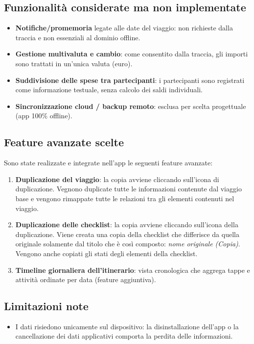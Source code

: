 \documentclass[11pt, a4paper]{article}
\begin{document}
\subsection{Funzionalità considerate ma non implementate}
\begin{itemize}[nosep]
    \item \textbf{Notifiche/promemoria} legate alle date del viaggio: non richieste dalla
    traccia e non essenziali al dominio offline.
    \item \textbf{Gestione multivaluta e cambio}: come consentito dalla traccia, gli importi
    sono trattati in un'unica valuta (euro).
    \item \textbf{Suddivisione delle spese tra partecipanti}: i partecipanti sono registrati
    come informazione testuale, senza calcolo dei saldi individuali.
    \item \textbf{Sincronizzazione cloud / backup remoto}: esclusa per scelta progettuale
    (app 100\% offline).
\end{itemize}

\subsection{Feature avanzate scelte}
\label{sec:advanced}
Sono state realizzate e integrate nell'app le seguenti feature avanzate:
\begin{enumerate}[nosep]
    \item \textbf{Duplicazione del viaggio}: la copia avviene cliccando sull'icona di duplicazione. Vegnono duplicate tutte le informazioni contenute dal viaggio base e vengono rimappate tutte le relazioni tra gli elementi contenuti nel viaggio.
    \item \textbf{Duplicazione delle checklist}: la copia avviene cliccando sull'icona della duplicazione. Viene creata una copia della checklist che differisce da quella originale solamente dal titolo che è così composto: \textit{nome originale (Copia)}. Vengono anche copiati gli stati degli elementi della checklist.
    \item \textbf{Timeline giornaliera dell'itinerario}: vista cronologica che aggrega
    tappe e attività ordinate per data (feature aggiuntiva).
\end{enumerate}

\subsection{Limitazioni note}
\begin{itemize}[nosep]
    \item I dati risiedono unicamente sul dispositivo: la disinstallazione dell'app o la
    cancellazione dei dati applicativi comporta la perdita delle informazioni.
\end{itemize}
\end{document}
